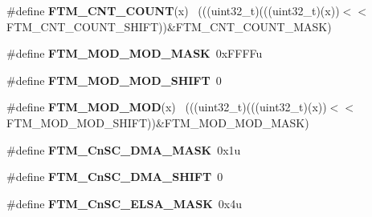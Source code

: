 \begin{DoxyCompactItemize}
\item 
\hypertarget{group___f_t_m___register___masks_ga2fbc38b4fdc6e3e78dddb3aee1e5a553}{}\#define {\bfseries F\+T\+M\+\_\+\+C\+N\+T\+\_\+\+C\+O\+U\+N\+T}(x)                                              ~(((uint32\+\_\+t)(((uint32\+\_\+t)(x))$<$$<$F\+T\+M\+\_\+\+C\+N\+T\+\_\+\+C\+O\+U\+N\+T\+\_\+\+S\+H\+I\+F\+T))\&F\+T\+M\+\_\+\+C\+N\+T\+\_\+\+C\+O\+U\+N\+T\+\_\+\+M\+A\+S\+K)\label{group___f_t_m___register___masks_ga2fbc38b4fdc6e3e78dddb3aee1e5a553}

\item 
\hypertarget{group___f_t_m___register___masks_gae815072c26d186e4ad07654080c7cb97}{}\#define {\bfseries F\+T\+M\+\_\+\+M\+O\+D\+\_\+\+M\+O\+D\+\_\+\+M\+A\+S\+K}~0x\+F\+F\+F\+Fu\label{group___f_t_m___register___masks_gae815072c26d186e4ad07654080c7cb97}

\item 
\hypertarget{group___f_t_m___register___masks_gac10320219038f5acd0cc6ed04c4f1f48}{}\#define {\bfseries F\+T\+M\+\_\+\+M\+O\+D\+\_\+\+M\+O\+D\+\_\+\+S\+H\+I\+F\+T}~0\label{group___f_t_m___register___masks_gac10320219038f5acd0cc6ed04c4f1f48}

\item 
\hypertarget{group___f_t_m___register___masks_gada05ad8063f19ad7e6883012ac88ec08}{}\#define {\bfseries F\+T\+M\+\_\+\+M\+O\+D\+\_\+\+M\+O\+D}(x)                                                  ~(((uint32\+\_\+t)(((uint32\+\_\+t)(x))$<$$<$F\+T\+M\+\_\+\+M\+O\+D\+\_\+\+M\+O\+D\+\_\+\+S\+H\+I\+F\+T))\&F\+T\+M\+\_\+\+M\+O\+D\+\_\+\+M\+O\+D\+\_\+\+M\+A\+S\+K)\label{group___f_t_m___register___masks_gada05ad8063f19ad7e6883012ac88ec08}

\item 
\hypertarget{group___f_t_m___register___masks_gab38e53cd8f53bb325b849510374280f8}{}\#define {\bfseries F\+T\+M\+\_\+\+Cn\+S\+C\+\_\+\+D\+M\+A\+\_\+\+M\+A\+S\+K}~0x1u\label{group___f_t_m___register___masks_gab38e53cd8f53bb325b849510374280f8}

\item 
\hypertarget{group___f_t_m___register___masks_ga86e1227e22b8a08811a810d4f8415ef1}{}\#define {\bfseries F\+T\+M\+\_\+\+Cn\+S\+C\+\_\+\+D\+M\+A\+\_\+\+S\+H\+I\+F\+T}~0\label{group___f_t_m___register___masks_ga86e1227e22b8a08811a810d4f8415ef1}

\item 
\hypertarget{group___f_t_m___register___masks_gab5c67eddb15cb1814ba34d7d65bcee29}{}\#define {\bfseries F\+T\+M\+\_\+\+Cn\+S\+C\+\_\+\+E\+L\+S\+A\+\_\+\+M\+A\+S\+K}~0x4u\label{group___f_t_m___register___masks_gab5c67eddb15cb1814ba34d7d65bcee29}


\end{DoxyCompactItemize}
